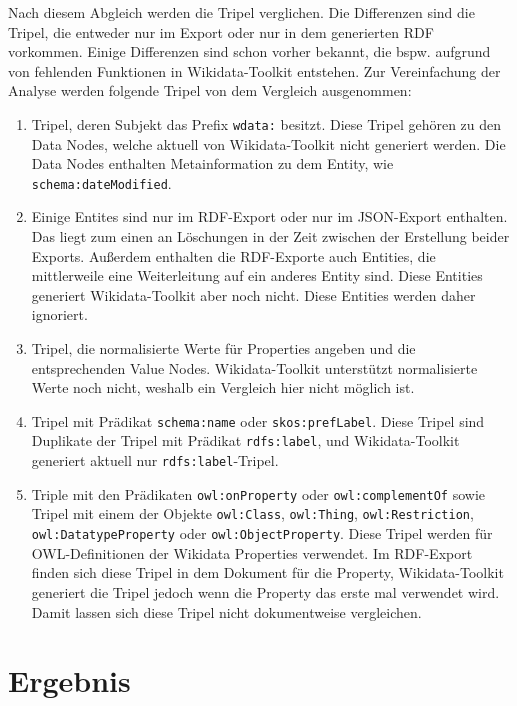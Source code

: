 Nach diesem Abgleich werden die Tripel verglichen.
Die Differenzen sind die Tripel, die entweder nur im Export oder nur in dem generierten RDF vorkommen.
Einige Differenzen sind schon vorher bekannt, die bspw. aufgrund von fehlenden Funktionen in Wikidata-Toolkit entstehen.
Zur Vereinfachung der Analyse werden folgende Tripel von dem Vergleich ausgenommen:
\begin{enumerate}
  \item Tripel, deren Subjekt das Prefix \verb|wdata:| besitzt. Diese Tripel gehören zu den Data Nodes, welche aktuell von Wikidata-Toolkit nicht generiert werden. Die Data Nodes enthalten Metainformation zu dem Entity, wie \verb|schema:dateModified|.
  \item Einige Entites sind nur im RDF-Export oder nur im JSON-Export enthalten. Das liegt zum einen an Löschungen in der Zeit zwischen der Erstellung beider Exports. Außerdem enthalten die RDF-Exporte auch Entities, die mittlerweile eine Weiterleitung auf ein anderes Entity sind. Diese Entities generiert Wikidata-Toolkit aber noch nicht. Diese Entities werden daher ignoriert.
  \item Tripel, die normalisierte Werte für Properties angeben und die entsprechenden Value Nodes. Wikidata-Toolkit unterstützt normalisierte Werte noch nicht, weshalb ein Vergleich hier nicht möglich ist.
  \item Tripel mit Prädikat \verb|schema:name| oder \verb|skos:prefLabel|. Diese Tripel sind Duplikate der Tripel mit Prädikat \verb|rdfs:label|, und Wikidata-Toolkit generiert aktuell nur \verb|rdfs:label|-Tripel.
  \item Triple mit den Prädikaten \verb|owl:onProperty| oder \verb|owl:complementOf| sowie Tripel mit einem der Objekte \verb|owl:Class|, \verb|owl:Thing|, \verb|owl:Restriction|, \verb|owl:DatatypeProperty| oder \verb|owl:ObjectProperty|. Diese Tripel werden für OWL-Definitionen der Wikidata Properties verwendet. Im RDF-Export finden sich diese Tripel in dem Dokument für die Property, Wikidata-Toolkit generiert die Tripel jedoch wenn die Property das erste mal verwendet wird. Damit lassen sich diese Tripel nicht dokumentweise vergleichen.
\end{enumerate}

\section{Ergebnis} 

